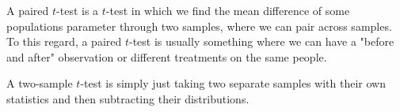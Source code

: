A paired \( t \)-test is a \( t \)-test in which we find the mean difference of
some populations parameter through two samples, where we can pair across
samples. To this regard, a paired \( t \)-test is usually something where we
can have a "before and after" observation or different treatments on the same
people.

A two-sample \( t \)-test is simply just taking two separate samples with their
own statistics and then subtracting their distributions.
